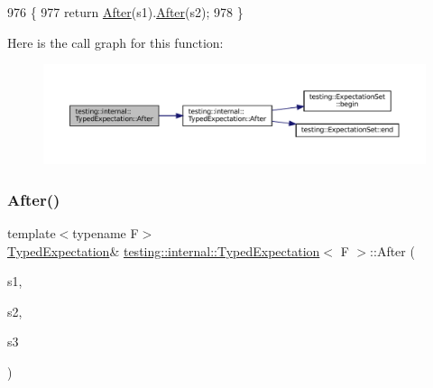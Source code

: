 \begin{DoxyCode}
976                                                                               \{
977     \textcolor{keywordflow}{return} \hyperlink{classtesting_1_1internal_1_1TypedExpectation_a30f320d18ebf1a40e94883d7a56c6c8c}{After}(s1).\hyperlink{classtesting_1_1internal_1_1TypedExpectation_a30f320d18ebf1a40e94883d7a56c6c8c}{After}(s2);
978   \}
\end{DoxyCode}
Here is the call graph for this function\+:
\nopagebreak
\begin{figure}[H]
\begin{center}
\leavevmode
\includegraphics[width=350pt]{classtesting_1_1internal_1_1TypedExpectation_a8e272fc396e508a2e63b13be30f81f15_cgraph}
\end{center}
\end{figure}
\mbox{\label{classtesting_1_1internal_1_1TypedExpectation_a95a341dd221901b5e51dd7cfdbdb3570}} 
\subsubsection{\texorpdfstring{After()}{After()}\hspace{0.1cm}{\footnotesize\ttfamily [3/5]}}
{\footnotesize\ttfamily template$<$typename F$>$ \\
\hyperlink{classtesting_1_1internal_1_1TypedExpectation}{Typed\+Expectation}\& \hyperlink{classtesting_1_1internal_1_1TypedExpectation}{testing\+::internal\+::\+Typed\+Expectation}$<$ F $>$\+::After (\begin{DoxyParamCaption}\item[{const \hyperlink{classtesting_1_1ExpectationSet}{Expectation\+Set} \&}]{s1,  }\item[{const \hyperlink{classtesting_1_1ExpectationSet}{Expectation\+Set} \&}]{s2,  }\item[{const \hyperlink{classtesting_1_1ExpectationSet}{Expectation\+Set} \&}]{s3 }\end{DoxyParamCaption})\hspace{0.3cm}{\ttfamily [inline]}}




